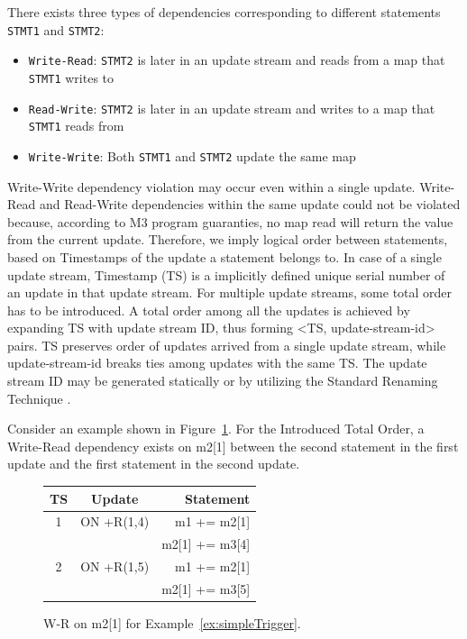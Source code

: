 \documentclass{sig-semester}
\def\M3{M3\xspace}
\begin{document}
There exists three types of dependencies corresponding to different statements \texttt{STMT1} and \texttt{STMT2}:
\begin{itemize}
 \item \texttt{Write-Read}: \texttt{STMT2} is later in an update stream and reads from a map that \texttt{STMT1} writes to
 \item \texttt{Read-Write}: \texttt{STMT2} is later in an update stream and writes to a map that \texttt{STMT1} reads from
 \item \texttt{Write-Write}: Both \texttt{STMT1} and \texttt{STMT2} update the same map
\end{itemize}

Write-Write dependency violation may occur even within a single update. Write-Read and Read-Write dependencies within the same update could not be violated because, according to \M3 program guaranties, no map read will return the value from the current update. Therefore, we imply logical order between statements, based on Timestamps of the update a statement belongs to. In case of a single update stream, Timestamp (TS) is a implicitly defined unique serial number of an update in that update stream. For multiple update streams, some total order has to be introduced. A total order among all the updates is achieved by expanding TS with update stream ID, thus forming <TS, update-stream-id> pairs. TS preserves order of updates arrived from a single update stream, while update-stream-id breaks ties among updates with the same TS. The update stream ID may be generated statically or by utilizing the Standard Renaming Technique \cite{Welch04}.

Consider an example shown in Figure~\ref{fig:streamWR}. For the Introduced Total Order, a Write-Read dependency exists on m2[1] between the second statement in the first update and the first statement in the second update.

\begin{figure}
\begin{center}

\begin{tabular}{c|c|r}
TS & Update & Statement\\
\hline
1 & ON +R(1,4) & m1 += m2[1]    \\
  &            & m2[1] += m3[4] \\
\hline
2 & ON +R(1,5) & m1 += m2[1]    \\
  &            & m2[1] += m3[5] \\
\end{tabular}
\end{center}

\vspace{-3mm}
\caption{W-R on m2[1] for Example~\ref{ex:simpleTrigger}.}
\label{fig:streamWR}
\vspace{-2mm}
\end{figure}
\end{document}
